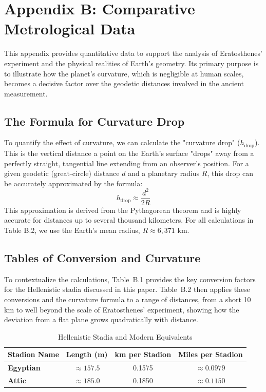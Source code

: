 \documentclass[11pt]{article}
\begin{document}
\section*{Appendix B: Comparative Metrological Data}

This appendix provides quantitative data to support the analysis of Eratosthenes' experiment and the physical realities of Earth's geometry. Its primary purpose is to illustrate how the planet's curvature, which is negligible at human scales, becomes a decisive factor over the geodetic distances involved in the ancient measurement.

\subsection*{The Formula for Curvature Drop}

To quantify the effect of curvature, we can calculate the "curvature drop" ($h_{\text{drop}}$). This is the vertical distance a point on the Earth's surface "drops" away from a perfectly straight, tangential line extending from an observer's position. For a given geodetic (great-circle) distance $d$ and a planetary radius $R$, this drop can be accurately approximated by the formula:
\[
h_{\text{drop}} \approx \frac{d^2}{2R}
\]
This approximation is derived from the Pythagorean theorem and is highly accurate for distances up to several thousand kilometers. For all calculations in Table B.2, we use the Earth's mean radius, $R \approx 6,371$ km.

\subsection*{Tables of Conversion and Curvature}

To contextualize the calculations, Table~B.1 provides the key conversion factors for the Hellenistic stadia discussed in this paper. Table~B.2 then applies these conversions and the curvature formula to a range of distances, from a short 10 km to well beyond the scale of Eratosthenes' experiment, showing how the deviation from a flat plane grows quadratically with distance.

\begin{table}[htbp]
\centering
\caption{Hellenistic Stadia and Modern Equivalents}
\label{tab:stadia_conversion}
\small
\begin{tabular}{@{}lccc@{}}
\toprule
\textbf{Stadion Name} & \textbf{Length (m)} & \textbf{km per Stadion} & \textbf{Miles per Stadion} \\
\midrule
\textbf{Egyptian} & $\approx 157.5$ & 0.1575 & $\approx 0.0979$ \\
\textbf{Attic}    & $\approx 185.0$ & 0.1850 & $\approx 0.1150$ \\
\bottomrule
\end{tabular}
\end{table}
\end{document}
